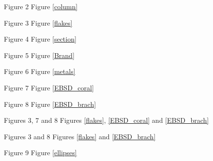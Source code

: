 Figure 2
Figure \ref{column}

Figure 3
Figure \ref{flakes}

Figure 4
Figure \ref{section}

Figure 5
Figure \ref{Brand}

Figure 6
Figure \ref{metals}

Figure 7
Figure \ref{EBSD_coral}

Figure 8
Figure \ref{EBSD_brach}

Figures 3, 7 and 8
Figures  \ref{flakes}, \ref{EBSD_coral} and \ref{EBSD_brach}

Figures 3 and 8
Figures \ref{flakes} and \ref{EBSD_brach}

Figure 9
Figure \ref{ellipses}

